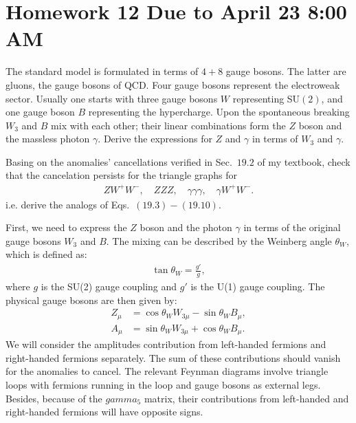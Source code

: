 \section*{Homework 12 Due to April 23 8:00 AM}

The standard model is formulated in terms of $4+8$ gauge bosons. The latter are gluons, the gauge bosons of QCD. Four gauge bosons represent the electroweak sector. Usually one starts with three gauge bosons $W$ representing SU$(2)$, and one gauge boson $B$ representing the hypercharge. Upon the spontaneous breaking $W_3$ and $B$ mix with each other; their linear combinations form the $Z$ boson and the massless photon $\gamma$. Derive the expressions for $Z$ and $\gamma$ in terms of $W_3$ and $\gamma$.

Basing on the anomalies’ cancellations verified in Sec.~$19.2$ of my textbook, check that the cancelation persists for the triangle graphs for 
\begin{align}
    ZW^+W^-, \quad ZZZ, \quad \gamma\gamma\gamma, \quad \gamma W^+W^-. 
\end{align} 
i.e. derive the analogs of Eqs.~$(19.3)-(19.10)$.

\answer{}
First, we need to express the $Z$ boson and the photon $\gamma$ in terms of the original gauge bosons $W_3$ and $B$. The mixing can be described by the Weinberg angle $\theta_W$, which is defined as:
\begin{align}
    \tan \theta_W = \frac{g'}{g},
\end{align}
where $g$ is the SU(2) gauge coupling and $g'$ is the U(1) gauge coupling. The physical gauge bosons are then given by:
\begin{align}
    Z_\mu &= \cos \theta_W W_{3\mu} - \sin \theta_W B_\mu, \\
    A_\mu &= \sin \theta_W W_{3\mu} + \cos \theta_W B_\mu.
\end{align}
We will consider the amplitudes contribution from left-handed fermions and right-handed fermions separately. The sum of these contributions should vanish for the anomalies to cancel. The relevant Feynman diagrams involve triangle loops with fermions running in the loop and gauge bosons as external legs. Besides, because of the $gamma_5$ matrix, their contributions from left-handed and right-handed fermions will have opposite signs.

